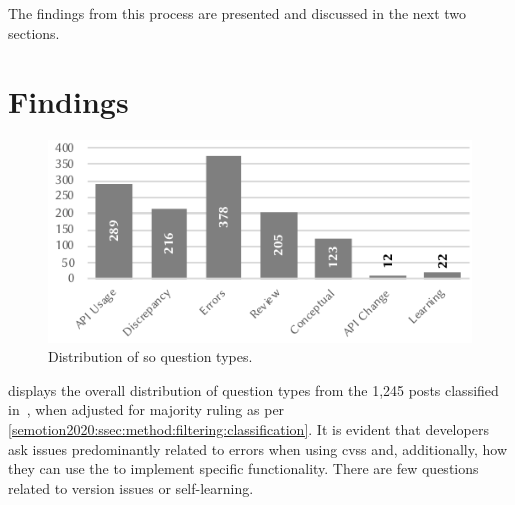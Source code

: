 The findings from this process are presented and discussed in the next two sections.


\section{Findings}\label{semotion2020:sec:findings}

\begin{figure}[tbh]
\centering
\includegraphics[width=.6\linewidth]{beyerclass}
\caption[Distribution of Stack Overflow question types]{Distribution of \gls{so} question types.}
\label{semotion2020:fig:beyer-classifications}
\end{figure}

 displays the overall distribution of question types from the 1,245 posts classified in~\citep{Cummaudo:2020icse}, when adjusted for majority ruling as per \cref{semotion2020:ssec:method:filtering:classification}. It is evident that developers ask issues predominantly related to  errors when using \glspl{cvs} and, additionally, how they can use the  to implement specific functionality. There are few questions related to version issues or self-learning.

\begin{table}[th]
\caption{Frequency of emotions per question type.}
\label{semotion2020:tab:emotion-freq}
\end{table}

